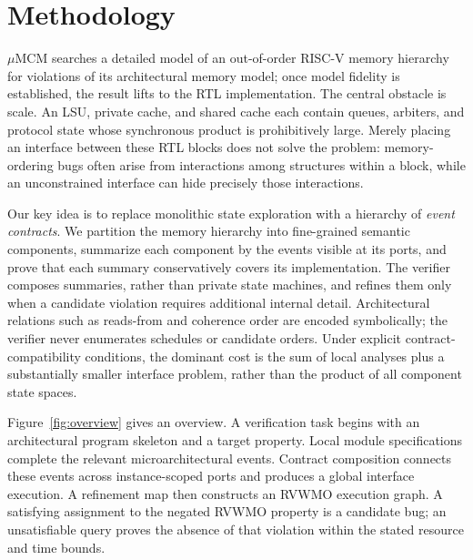 
\providecommand{\sys}{\ensuremath{\mu}\textsc{MCM}}
\providecommand{\traces}{\mathcal{T}}
\providecommand{\proj}{\mathop{\downarrow}}

\section{Methodology}
\label{sec:method}

\sys{} searches a detailed model of an out-of-order RISC-V memory hierarchy
for violations of its architectural memory model; once model fidelity is
established, the result lifts to the RTL implementation.  The central obstacle is scale.
An LSU, private cache, and shared cache each contain queues, arbiters, and
protocol state whose synchronous product is prohibitively large.  Merely
placing an interface between these RTL blocks does not solve the problem:
memory-ordering bugs often arise from interactions among structures within a
block, while an unconstrained interface can hide precisely those interactions.

Our key idea is to replace monolithic state exploration with a hierarchy of
\emph{event contracts}.  We partition the memory hierarchy into fine-grained
semantic components, summarize each component by the events visible at its
ports, and prove that each summary conservatively covers its implementation.
The verifier composes summaries, rather than private state machines, and
refines them only when a candidate violation requires additional internal
detail.  Architectural relations such as reads-from and coherence order are
encoded symbolically; the verifier never enumerates schedules or candidate
orders.  Under explicit contract-compatibility conditions, the dominant cost
is the sum of local analyses plus a substantially smaller interface problem,
rather than the product of all component state spaces.

Figure~\ref{fig:overview} gives an overview.  A verification task begins with
an architectural program skeleton and a target property.  Local module
specifications complete the relevant microarchitectural events.  Contract
composition connects these events across instance-scoped ports and produces a
global interface execution.  A refinement map then constructs an RVWMO
execution graph.  A satisfying assignment to the negated RVWMO property is a
candidate bug; an unsatisfiable query proves the absence of that violation
within the stated resource and time bounds.

